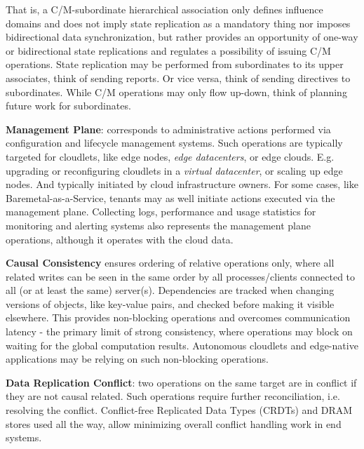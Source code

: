 \documentclass[conference]{IEEEtran}
\begin{document}
That is, a C/M-subordinate hierarchical association only defines influence
domains and does not imply state replication as a mandatory thing nor imposes
bidirectional data synchronization, but rather provides an opportunity of
one-way or bidirectional state replications and regulates a possibility of
issuing C/M operations. State replication may be performed from subordinates to
its upper associates, think of sending reports. Or vice versa, think of sending
directives to subordinates. While C/M operations may only flow up-down, think
of planning future work for subordinates.

\textbf{Management Plane}: corresponds to administrative actions performed via
configuration and lifecycle management systems. Such operations are typically
targeted for cloudlets, like edge nodes, \textit{edge datacenters}\cite{b3},
or edge clouds. E.g. upgrading or reconfiguring cloudlets in a \textit{virtual
datacenter}\cite{b3}, or scaling up edge nodes. And typically initiated by
cloud infrastructure owners. For some cases, like Baremetal-as-a-Service,
tenants may as well initiate actions executed via the management plane.
Collecting logs, performance and usage statistics for monitoring and alerting
systems also represents the management plane operations, although it operates
with the cloud data.

\textbf{Causal Consistency}\cite{b6} ensures ordering of relative operations
only, where all related writes can be seen in the same order by all
processes/clients connected to all (or at least the same) server(s).
Dependencies are tracked when changing versions of objects, like key-value
pairs, and checked before making it visible elsewhere. This provides
non-blocking operations and overcomes communication latency - the primary limit
of strong consistency, where operations may block on waiting for the global
computation results. Autonomous cloudlets and edge-native applications may be
relying on such non-blocking operations.

\textbf{Data Replication Conflict}: two operations on the same target are in
conflict if they are not causal related. Such operations require further
reconciliation, i.e. resolving the conflict. Conflict-free Replicated Data
Types (CRDTs) and DRAM stores used all the way, allow minimizing overall
conflict handling work in end systems.
\end{document}

